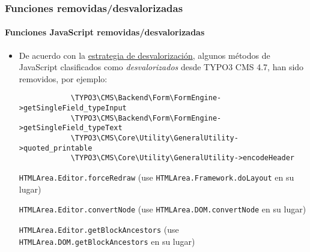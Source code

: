 \begin{frame}[fragile]
	\frametitle{Funciones removidas/desvalorizadas}
	\framesubtitle{Funciones JavaScript removidas/desvalorizadas}

	\begin{itemize}
		\item De acuerdo con la \href{http://forge.typo3.org/projects/typo3v4-core/wiki/CoreDevPolicy}{estrategia de desvalorización},
			algunos métodos de JavaScript clasificados como \textit{desvalorizados} desde TYPO3 CMS 4.7, han sido removidos, por ejemplo:

		\begin{lstlisting}
			\TYPO3\CMS\Backend\Form\FormEngine->getSingleField_typeInput
			\TYPO3\CMS\Backend\Form\FormEngine->getSingleField_typeText
			\TYPO3\CMS\Core\Utility\GeneralUtility->quoted_printable
			\TYPO3\CMS\Core\Utility\GeneralUtility->encodeHeader
		\end{lstlisting}

		\smaller
			\texttt{HTMLArea.Editor.forceRedraw}\newline
				(use \texttt{HTMLArea.Framework.doLayout} en su lugar)
				\vspace{0.2cm}

			\texttt{HTMLArea.Editor.convertNode}\newline
				(use \texttt{HTMLArea.DOM.convertNode} en su lugar)
				\vspace{0.2cm}

			\texttt{HTMLArea.Editor.getBlockAncestors}\newline
				(use \texttt{HTMLArea.DOM.getBlockAncestors} en su lugar)
		\normalsize

	\end{itemize}

\end{frame}


